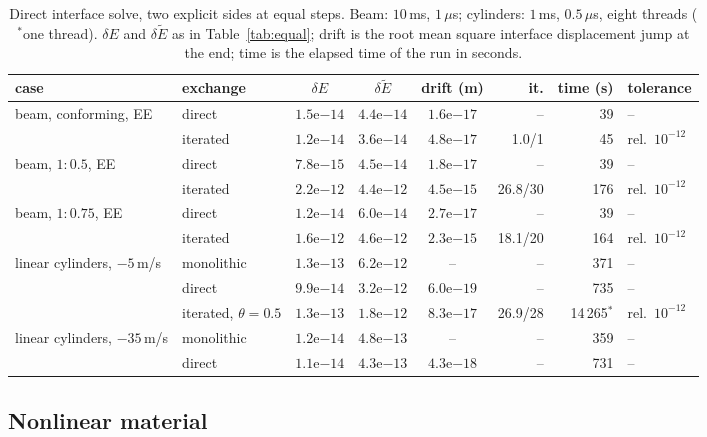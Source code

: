 \documentclass[11pt]{article}
\begin{document}
\begin{table}[htbp]
\centering
\caption{Direct interface solve, two explicit sides at equal steps. Beam:
$10$\,ms, $1\,\mu$s; cylinders: $1$\,ms, $0.5\,\mu$s, eight threads
($^{*}$one thread). $\delta E$ and $\delta\tilde{E}$ as in
Table~\ref{tab:equal}; drift is the root mean square interface
displacement jump at the end; time is the elapsed time of the run in
seconds.}
\label{tab:direct}
\footnotesize\setlength{\tabcolsep}{3pt}
\begin{tabular}{llcccrrl}
\toprule
case & exchange & $\delta E$ & $\delta \tilde{E}$ & drift (m) & it. & time (s) & tolerance \\
\midrule
beam, conforming, EE & direct & $1.5\mathrm{e}{-14}$ & $4.4\mathrm{e}{-14}$ & $1.6\mathrm{e}{-17}$ & -- & 39 & -- \\
 & iterated & $1.2\mathrm{e}{-14}$ & $3.6\mathrm{e}{-14}$ & $4.8\mathrm{e}{-17}$ & 1.0/1 & 45 & rel.\ $10^{-12}$ \\
beam, $1{:}0.5$, EE & direct & $7.8\mathrm{e}{-15}$ & $4.5\mathrm{e}{-14}$ & $1.8\mathrm{e}{-17}$ & -- & 39 & -- \\
 & iterated & $2.2\mathrm{e}{-12}$ & $4.4\mathrm{e}{-12}$ & $4.5\mathrm{e}{-15}$ & 26.8/30 & 176 & rel.\ $10^{-12}$ \\
beam, $1{:}0.75$, EE & direct & $1.2\mathrm{e}{-14}$ & $6.0\mathrm{e}{-14}$ & $2.7\mathrm{e}{-17}$ & -- & 39 & -- \\
 & iterated & $1.6\mathrm{e}{-12}$ & $4.6\mathrm{e}{-12}$ & $2.3\mathrm{e}{-15}$ & 18.1/20 & 164 & rel.\ $10^{-12}$ \\
linear cylinders, $-5$\,m/s & monolithic & $1.3\mathrm{e}{-13}$ & $6.2\mathrm{e}{-12}$ & -- & -- & 371 & -- \\
 & direct & $9.9\mathrm{e}{-14}$ & $3.2\mathrm{e}{-12}$ & $6.0\mathrm{e}{-19}$ & -- & 735 & -- \\
 & iterated, $\theta = 0.5$ & $1.3\mathrm{e}{-13}$ & $1.8\mathrm{e}{-12}$ & $8.3\mathrm{e}{-17}$ & 26.9/28 & 14\,265$^{*}$ & rel.\ $10^{-12}$ \\
linear cylinders, $-35$\,m/s & monolithic & $1.2\mathrm{e}{-14}$ & $4.8\mathrm{e}{-13}$ & -- & -- & 359 & -- \\
 & direct & $1.1\mathrm{e}{-14}$ & $4.3\mathrm{e}{-13}$ & $4.3\mathrm{e}{-18}$ & -- & 731 & -- \\
\bottomrule
\end{tabular}
\end{table}

\subsection{Nonlinear material}
\end{document}
